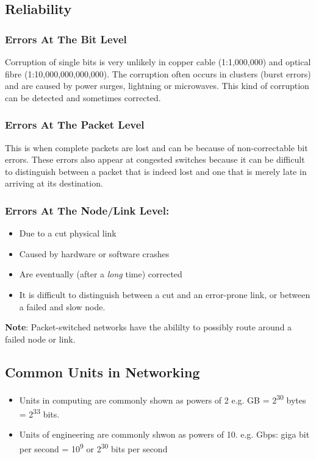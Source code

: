 \documentclass{article}%
\begin{document}
\subsection{Reliability}
\label{sec:orgbeeb098}
\subsubsection{Errors At The Bit Level}
\label{sec:orgbd5cb0c}
Corruption of single bits is very unlikely in copper cable (1:1,000,000) and optical fibre (1:10,000,000,000,000).
The corruption often occurs in clusters (burst errors) and are caused by power surges, lightning or microwaves.
This kind of corruption can be detected and sometimes corrected.

\subsubsection{Errors At The Packet Level}
\label{sec:orgffac70e}
This is when complete packets are lost and can be because of non-correctable bit errors.
These errors also appear at congested switches because it can be difficult to distinguish between a packet that is indeed lost and one that is merely late in arriving at its destination.

\subsubsection{Errors At The Node/Link Level:}
\label{sec:org9803586}
\begin{itemize}
\item Due to a cut physical link
\item Caused by hardware or software crashes
\item Are eventually (after a \emph{long} time) corrected
\item It is difficult to distinguish between a cut and an error-prone link, or between a failed and slow node.
\end{itemize}
\textbf{Note}: Packet-switched networks have the abililty to possibly route around a failed node or link.

\subsection{Common Units in Networking}
\label{sec:orgdb20f1d}
\begin{itemize}
\item Units in computing are commonly shown as powers of 2 e.g. GB = 2\textsuperscript{30} bytes = 2\textsuperscript{33} bits.
\item Units of engineering are commonly shwon as powers of 10. e.g. Gbps: giga bit per second = 10\textsuperscript{9} or 2\textsuperscript{30} bits per second
\end{itemize}
\end{document}

